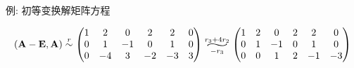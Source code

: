 \begin{frame}{例: 初等变换解矩阵方程}
	\onslide<+->
	\begin{solutionc}
		\[(\bfA-\bfE,\bfA)\simr\begin{pmatrix}
			1&2&0&2&2&0\\
			0&1&-1&0&1&0\\
			0&-4&3&-2&-3&3
		\end{pmatrix}\wsim[3]{r_3+4r_2}{-r_3}\begin{pmatrix}
			1&2&0&2&2&0\\
			0&1&-1&0&1&0\\
			0&0&1&2&-1&-3
		\end{pmatrix}\]

	\end{solutionc}
\end{frame}


